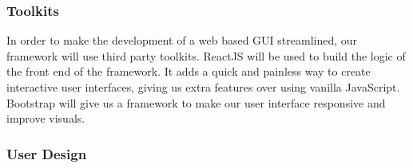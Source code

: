 \documentclass[draftclsnofoot, onecolumn, compsoc, 10pt]{IEEEtran}
\begin{document}

\subsubsection{Toolkits}
In order to make the development of a web based GUI streamlined, our framework will use third party toolkits. ReactJS will be used to build the logic of the front end of the framework. It adds a quick and painless way to create interactive user interfaces, giving us extra features over using vanilla JavaScript. Bootstrap will give us a framework to make our user interface responsive and improve visuals.

\subsubsection{User Design}
\end{document}
